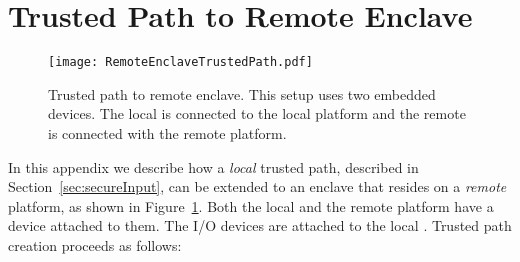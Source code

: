 \section{Trusted Path to Remote Enclave} 
\label{sec:trustedPathAppendix}



%


\begin{figure}[t]
 \centering
  \texttt{[image: RemoteEnclaveTrustedPath.pdf]}
 \caption{Trusted path to remote enclave. This setup uses two embedded devices. The local \device is connected to the local platform and the remote \device is connected with the remote platform.}
	\figsaver
 \label{fig:systemRemoteHost}
\end{figure}


In this appendix we describe how a \emph{local} trusted path, described in Section~\ref{sec:secureInput}, can be extended to an enclave that resides on a \emph{remote} platform, as shown in Figure~\ref{fig:systemRemoteHost}. Both the local and the remote platform have a \device device attached to them. The I/O devices are attached to the local \device. Trusted path creation proceeds as follows:

